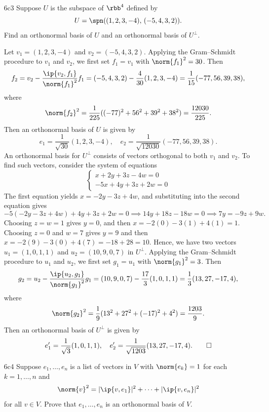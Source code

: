 \begin{exercise}{6c3}
    Suppose $U$ is the subspace of $\rbb^4$ defined by
    \[
        U = \spn((1, 2, 3, -4),\, (-5, 4, 3, 2)).
    \]
    Find an orthonormal basis of $U$ and an orthonormal basis of $U^\perp$.
\end{exercise}

\begin{sol}
    Let $v_1= (1, 2, 3, -4)$ and $v_2 = (-5, 4, 3, 2)$.
    Applying the Gram--Schmidt procedure to $v_1$ and $v_2$, we first set $f_1 = v_1$ with $\norm{f_1}^2 = 30$.
    Then
    \[
        f_2 = v_2 - \frac{\ip{v_2, f_1}}{\norm{f_1}^2} f_1 = (-5, 4, 3, 2) - \frac{4}{30}(1, 2, 3, -4) = \frac{1}{15}(-77, 56, 39, 38),
    \]
    where
    \[
        \norm{f_2}^2 = \frac{1}{225}((-77)^2 + 56^2 + 39^2 + 38^2) = \frac{12030}{225}.
    \]
    Then an orthonormal basis of $U$ is given by
    \[
        e_1 = \frac{1}{\sqrt{30}}(1, 2, 3, -4), \quad e_2 = \frac{1}{\sqrt{12030}}(-77, 56, 39, 38).
    \]
    An orthonormal basis for $U^\perp$ consists of vectors orthogonal to both $v_1$ and $v_2$.
    To find such vectors, consider the system of equations
    \[
        \begin{cases}
            x + 2y + 3z - 4w = 0 \\
            -5x + 4y + 3z + 2w = 0
        \end{cases}
    \]
    The first equation yields $x = -2y - 3z + 4w$, and substituting into the second equation gives
    \[
        -5(-2y - 3z + 4w) + 4y + 3z + 2w = 0 \implies 14y + 18z - 18w = 0 \implies 7y = -9z + 9w.
    \]
    Choosing $z = w = 1$ gives $y = 0$, and then $x = -2(0) - 3(1) + 4(1) = 1$.
    Choosing $z = 0$ and $w = 7$ gives $y = 9$ and then $x = -2(9) - 3(0) + 4(7) = -18 + 28 = 10$.
    Hence, we have two vectors $u_1 = (1, 0, 1, 1)$ and $u_2 = (10, 9, 0, 7)$ in $U^\perp$.
    Applying the Gram--Schmidt procedure to $u_1$ and $u_2$, we first set $g_1 = u_1$ with $\norm{g_1}^2 = 3$.
    Then
    \[
        g_2 = u_2 - \frac{\ip{u_2, g_1}}{\norm{g_1}^2} g_1 = (10, 9, 0, 7) - \frac{17}{3}(1, 0, 1, 1) = \frac{1}{3}(13, 27, -17, 4),
    \]
    where
    \[
        \norm{g_2}^2 = \frac{1}{9}(13^2 + 27^2 + (-17)^2 + 4^2) = \frac{1203}{9}.
    \]
    Then an orthonormal basis of $U^\perp$ is given by
    \[
        e_1' = \frac{1}{\sqrt{3}}(1, 0, 1, 1), \quad e_2' = \frac{1}{\sqrt{1203}}(13, 27, -17, 4). \qedhere
    \]
\end{sol}

\begin{exercise}{6c4}
    Suppose $e_1, \ldots, e_n$ is a list of vectors in $V$ with $\norm{e_k} = 1$ for each $k = 1, \ldots, n$ and
    \[
        \norm{v}^2 = |\ip{v, e_1}|^2 + \cdots + |\ip{v, e_n}|^2
    \]
    for all $v \in V$.
    Prove that $e_1, \ldots, e_n$ is an orthonormal basis of $V$.

\end{exercise}

